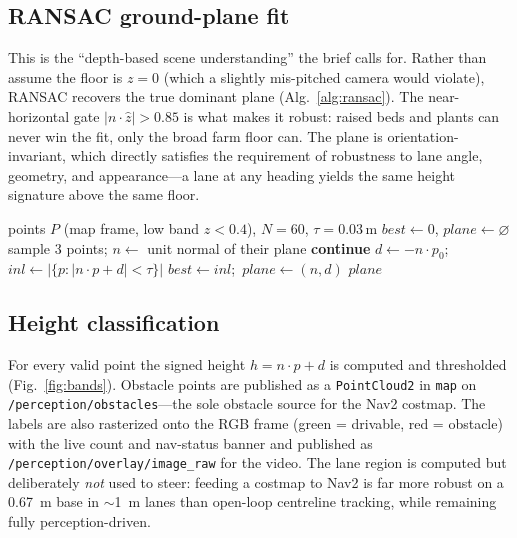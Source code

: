 \documentclass[10pt,journal,twoside]{IEEEtran}
\begin{document}
\subsection{RANSAC ground-plane fit}
This is the ``depth-based scene understanding'' the brief calls for. Rather than assume the floor is $z{=}0$ (which a slightly mis-pitched camera would violate), RANSAC recovers the true dominant plane (Alg.~\ref{alg:ransac}). The near-horizontal gate $|n\cdot\hat z|>0.85$ is what makes it robust: raised beds and plants can never win the fit, only the broad farm floor can. The plane is orientation-invariant, which directly satisfies the requirement of robustness to lane angle, geometry, and appearance---a lane at any heading yields the same height signature above the same floor.

\begin{algorithm}[!t]
\caption{RANSAC ground-plane estimation}
\label{alg:ransac}
\footnotesize
\begin{algorithmic}[1]
\Require points $P$ (map frame, low band $z<0.4$), $N{=}60$, $\tau{=}0.03$\,m
\State $best \gets 0$, $plane \gets \varnothing$
  \State sample 3 points; $n \gets$ unit normal of their plane
   \State \textbf{continue}  \EndIf
  \State $d \gets -n\cdot p_0$;\quad $inl \gets |\{p: |n\cdot p + d| < \tau\}|$
   \State $best \gets inl$;\ $plane \gets (n,d)$ \EndIf
\EndFor
\State \Return $plane$ 
\end{algorithmic}
\end{algorithm}

\subsection{Height classification}
For every valid point the signed height $h=n\cdot p + d$ is computed and thresholded (Fig.~\ref{fig:bands}). Obstacle points are published as a \texttt{PointCloud2} in \texttt{map} on \texttt{/perception/obstacles}---the sole obstacle source for the Nav2 costmap. The labels are also rasterized onto the RGB frame (green = drivable, red = obstacle) with the live count and nav-status banner and published as \texttt{/perception/overlay/image\_raw} for the video. The lane region is computed but deliberately \emph{not} used to steer: feeding a costmap to Nav2 is far more robust on a 0.67~m base in $\sim$1~m lanes than open-loop centreline tracking, while remaining fully perception-driven.
\end{document}
